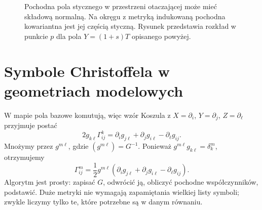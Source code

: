 \begin{figure}[H]
\centering
{}
\caption{Pochodna pola stycznego w przestrzeni otaczającej
może mieć składową normalną.
Na okręgu z metryką indukowaną pochodna kowariantna
jest jej częścią styczną. Rysunek przedstawia rozkład
w punkcie $p$ dla pola $Y=(1+s)T$ opisanego powyżej.}
\label{fig:koneksja-rzut-pochodnej}
\end{figure}

\section{Symbole Christoffela w geometriach modelowych}
\label{sec:christoffel-przyklady}

W mapie pola bazowe komutują, więc wzór Koszula
z $X=\partial_i$, $Y=\partial_j$, $Z=\partial_\ell$
przyjmuje postać
\[
 2g_{k\ell}\Gamma^k_{ij}
 =\partial_i g_{j\ell}+\partial_j g_{i\ell}
    -\partial_\ell g_{ij}.
\]
Mnożymy przez $g^{m\ell}$, gdzie
$(g^{m\ell})=G^{-1}$. Ponieważ
$g^{m\ell}g_{k\ell}=\delta^m_k$, otrzymujemy
\begin{equation}\label{eq:christoffel-metryka}
 \boxed{\displaystyle
 \Gamma^m_{ij}=\frac12 g^{m\ell}
  (\partial_i g_{j\ell}+\partial_j g_{i\ell}
                         -\partial_\ell g_{ij}).}
\end{equation}
Algorytm jest prosty: zapisać $G$, odwrócić ją,
obliczyć pochodne współczynników, podstawić.
Duże metryki nie wymagają zapamiętania wielkiej
listy symboli; zwykle liczymy tylko te, które
potrzebne są w danym równaniu.

